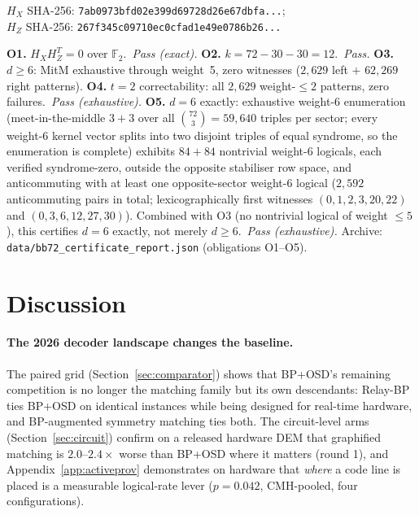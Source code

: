 \documentclass[11pt,a4paper]{article}
\begin{document}
$H_X$ SHA-256: \texttt{7ab0973bfd02e399d69728d26e67dbfa...};\\
$H_Z$ SHA-256: \texttt{267f345c09710ec0cfad1e49e0786b26...}

\textbf{O1.} $H_XH_Z^T=0$ over $\mathbb{F}_2$.\ \textit{Pass (exact).}
\textbf{O2.} $k=72-30-30=12$.\ \textit{Pass.}
\textbf{O3.} $d\ge6$: MitM exhaustive through weight~5, zero witnesses
($2{,}629$ left $+$ $62{,}269$ right patterns).
\textbf{O4.} $t=2$ correctability: all $2{,}629$ weight-$\le2$ patterns,
zero failures.\ \textit{Pass (exhaustive).}
\textbf{O5.} $d=6$ exactly: exhaustive weight-6 enumeration
(meet-in-the-middle $3{+}3$ over all $\binom{72}{3}=59{,}640$ triples per
sector; every weight-6 kernel vector splits into two disjoint triples of
equal syndrome, so the enumeration is complete) exhibits $84+84$
nontrivial weight-6 logicals, each verified syndrome-zero, outside the
opposite stabiliser row space, and anticommuting with at least one
opposite-sector weight-6 logical ($2{,}592$ anticommuting pairs in total;
lexicographically first witnesses $(0,1,2,3,20,22)$ and $(0,3,6,12,27,30)$).
Combined with O3 (no nontrivial logical of weight $\le5$), this certifies
$d=6$ exactly, not merely $d\ge6$.\ \textit{Pass (exhaustive).}
Archive: \texttt{data/bb72\_certificate\_report.json} (obligations O1--O5).

\section{Discussion}

\paragraph{The 2026 decoder landscape changes the baseline.}
The paired grid (Section~\ref{sec:comparator}) shows that BP+OSD's remaining
competition is no longer the matching family but its own descendants:
Relay-BP ties BP+OSD on identical instances while being designed for
real-time hardware, and BP-augmented symmetry matching ties both. The
circuit-level arms (Section~\ref{sec:circuit}) confirm on a released
hardware DEM that graphified matching is $2.0$--$2.4\times$ worse than
BP+OSD where it matters (round 1), and Appendix~\ref{app:activeprov}
demonstrates on hardware that \emph{where} a code line is placed is a
measurable logical-rate lever ($p=0.042$, CMH-pooled, four configurations).
\end{document}
